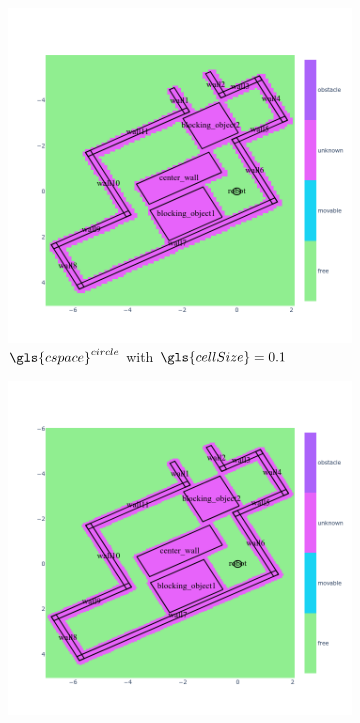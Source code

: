 \begin{figure}[H]
  \centering
  \begin{subfigure}{.49\textwidth}
    \centering
    \includegraphics[width=1.05\textwidth]{figures/required_background/planning/c_space_point_robot_grid_size_0_1}
    \caption{$\gls{cspace}^{circle}$ with $\gls{cellSize} = 0.1$}%
    \label{fig:c_space_two_pushes_small}
  \end{subfigure}
  \begin{subfigure}{.49\textwidth}
    \centering
    \includegraphics[width=1.05\textwidth]{figures/required_background/planning/c_space_point_robot_grid_size_0_05}

\end{subfigure}
\end{figure}
